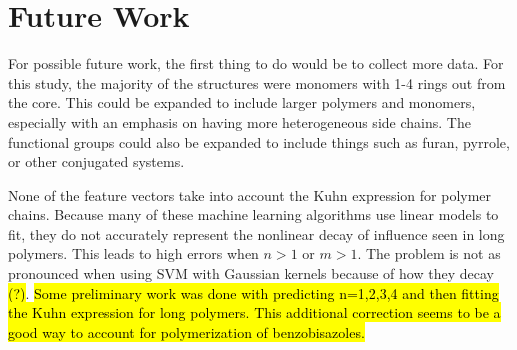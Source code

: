\documentclass[10pt]{article}
\begin{document}
\section{Future Work}

For possible future work, the first thing to do would be to collect more data. For this study, the majority of the structures were monomers with 1-4 rings out from the core. This could be expanded to include larger polymers and monomers, especially with an emphasis on having more heterogeneous side chains. The functional groups could also be expanded to include things such as furan, pyrrole, or other conjugated systems.

None of the feature vectors take into account the Kuhn expression for polymer chains. Because many of these machine learning algorithms use linear models to fit, they do not accurately represent the nonlinear decay of influence seen in long polymers. This leads to high errors when $n>1$ or $m>1$. The problem is not as pronounced when using SVM with Gaussian kernels because of how they decay \hl{(?)}. \hl{Some preliminary work was done with predicting n=1,2,3,4 and then fitting the Kuhn expression for long polymers. This additional correction seems to be a good way to account for polymerization of benzobisazoles.}



\end{document}
